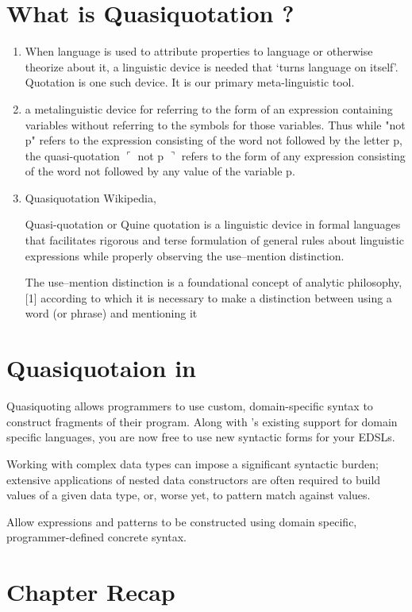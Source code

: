 \documentclass[thesis-solanki.tex]{subfiles}
\begin{document}
\section{What is Quasiquotation ?}
\begin{enumerate}
\item \cite{website:quotationstanford}

When language is used to attribute properties to language or otherwise theorize about it, a linguistic device is needed that ‘turns 
language on itself’. Quotation is one such device. It is our primary meta-linguistic tool.

\item \cite{website:quasiquotationfreedictionary}

a metalinguistic device for referring to the form of an expression containing variables without referring to the symbols for those 
variables. Thus while "not p" refers to the expression consisting of the word not followed by the letter p, the quasi-quotation \newline
$\ulcorner$ not p $\urcorner$ refers to the form of any expression consisting of the word not followed by any value of the variable p.

\item  Quasiquotation Wikipedia, \cite{wikiquasi}

Quasi-quotation or Quine quotation is a linguistic device in formal languages that facilitates rigorous and terse formulation of general rules about linguistic expressions while properly observing the use–mention distinction.

\cite{website:usementiondistinctionwiki}
The use–mention distinction is a foundational concept of analytic philosophy,[1] according to which it is necessary to make a distinction 
between using a word (or phrase) and mentioning it


\end{enumerate}

\section{Quasiquotaion in }
\cite{haskellquasi, mainland2007s} 

Quasiquoting allows programmers to use custom, domain-specific syntax to construct fragments of their program. Along with 
's existing support for domain specific languages, you are now free to use new syntactic forms for your EDSLs. 

Working with complex data types can impose a significant syntactic burden; extensive applications of nested data constructors are often 
required to build values of a given data type, or, worse yet, to pattern match against values.

Allow  expressions and patterns to be constructed using domain specific, programmer-defined concrete syntax.


\section{Chapter Recap}
\end{document}
